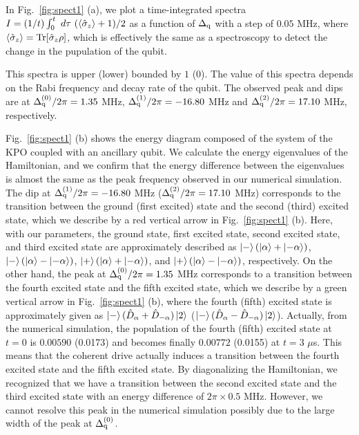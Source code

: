 In Fig.~\ref{fig:spect1} (a), we plot a time-integrated spectra $I=(1/t)\int_{0}^{t}\ d\tau\ (\braket{\hat{\sigma}_z}+1)/2$ as a function of $\Delta_{\rm{q}}$ with a step of $0.05$ MHz,
where $\braket{\hat{\sigma}_z}={\rm{Tr}}[\hat{\sigma}_z \rho ]$,
which is effectively the same as a spectroscopy to detect the change in the pupulation of the qubit.

This spectra is upper (lower) bounded by $1$ ($0$).
The value of this spectra depends on the Rabi frequency and decay rate of the qubit.
The observed peak and dips are at $\Delta_{\rm{q}}^{(0)}/2\pi=1.35$ MHz, $\Delta_{\rm{q}}^{(1)}/2\pi= -16.80$ MHz and $\Delta_{\rm{q}}^{(2)}/2\pi = 17.10$ MHz, respectively.

Fig.~\ref{fig:spect1} (b) shows the energy diagram composed of the system of the KPO coupled with an ancillary qubit.
We calculate the energy eigenvalues of the Hamiltonian, and we confirm that the energy difference between the eigenvalues is almost the same as the peak frequency observed in our numerical simulation.
The dip at $\Delta_{\rm{q}}^{(1)}/2\pi= -16.80$ MHz ($\Delta_{\rm{q}}^{(2)}/2\pi = 17.10$ MHz) corresponds to the transition between the ground (first excited) state and the second (third) excited state, which we describe by a red vertical arrow in Fig.~\ref{fig:spect1} (b).
Here, with our parameters, the ground state, first excited state, second excited state, and third excited state 
 are approximately described as
$\ket{-}(\ket{\alpha}+\ket{-\alpha})$,
$\ket{-}(\ket{\alpha}-\ket{-\alpha})$,
$\ket{+}(\ket{\alpha}+\ket{-\alpha})$, and
$\ket{+}(\ket{\alpha}-\ket{-\alpha})$, respectively.
 On the other hand, the peak at $\Delta_{\rm{q}}^{(0)}/2\pi=1.35$ MHz corresponds to a transition between the fourth excited state and the fifth excited state, which we describe by a green vertical arrow in Fig.~\ref{fig:spect1} (b),
 where the fourth (fifth) excited state is approximately given as $\ket{-}(\hat{D}_{\alpha}+\hat{D}_{-\alpha})\ket{2}$ ($\ket{-}(\hat{D}_{\alpha}-\hat{D}_{-\alpha})\ket{2}$).
Actually, from the numerical simulation, the population of the fourth  (fifth) excited state at $t=0$ is $0.00590$ (0.0173) and becomes finally $0.00772$ (0.0155) at $t=3$ $\mu$s. This means that the coherent drive actually induces a transition between the fourth excited state and the fifth excited state.
By diagonalizing the Hamiltonian, we recognized that we have a transition between the second excited state and the third excited state
 with an energy difference of
 $2\pi \times 0.5$ MHz.
 However, we cannot resolve this peak in the numerical simulation possibly due to the large width of the peak at $\Delta_{\rm{q}}^{(0)}$.





